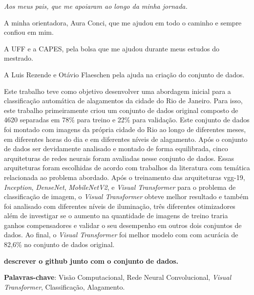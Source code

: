 \begin{flushright}
{\em 
    Aos meus pais, que me apoiaram ao longo da minha jornada.
}
\end{flushright}
\newpage


\hspace{5mm}
A minha orientadora, Aura Conci, que me ajudou em todo o caminho e sempre confiou em mim.

A UFF e a CAPES, pela bolsa que me ajudou durante meus estudos do mestrado.

A Luis Rezende e Otávio Flaeschen pela ajuda na criação do conjunto de dados.



\begin{resumo}


Este trabalho teve como objetivo desenvolver uma abordagem inicial para a classificação automática de alagamentos da cidade do Rio de Janeiro.
Para isso, este trabalho primeiramente criou um conjunto de dados original composto de 4620 separadas em 78\% para treino e 22\% para validação.
Este conjunto de dados foi montado com imagens da própria cidade do Rio ao longo de diferentes meses, em diferentes horas do dia e em diferentes níveis de alagamento.
Após o conjunto de dados ser devidamente analisado e montado de forma equilibrada, cinco arquiteturas de redes neurais foram avaliadas nesse conjunto de dados. 
Essas arquiteturas foram escolhidas de acordo com trabalhos da literatura com temática relacionada ao problema abordado.
Após o treinamento das arquiteturas \acrshort{vgg}-19, \textit{Inception}, \textit{DenseNet}, \textit{MobileNetV2}, e \textit{Visual Transformer} para o problema de classificação de imagem, 
o \textit{Visual Transformer} obteve melhor resultado e também foi analisado com diferentes níveis de iluminação, três diferentes otimizadores além de investigar se o aumento 
na quantidade de imagens de treino traria ganhos compensadores e validar o seu desempenho em outros dois conjuntos de dados.
Ao final, o \textit{Visual Transformer} foi melhor modelo com com acurácia de 82,6\% no conjunto de dados original.

\textbf{descrever o github junto com o conjunto de dados.}

{\hspace{-8mm} \bf{Palavras-chave}}: Visão Computacional, Rede Neural Convolucional, \textit{Visual Transformer}, Classificação, Alagamento.

\end{resumo}

